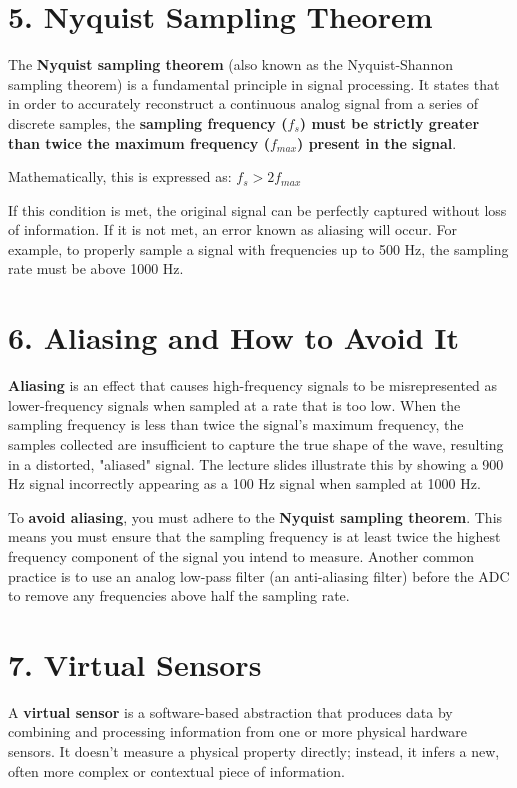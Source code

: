 \documentclass[a4paper,12pt]{article}
\begin{document}
\section*{5. Nyquist Sampling Theorem}

The \textbf{Nyquist sampling theorem} (also known as the Nyquist-Shannon sampling theorem) is a fundamental principle in signal processing. It states that in order to accurately reconstruct a continuous analog signal from a series of discrete samples, the \textbf{sampling frequency ($f_s$) must be strictly greater than twice the maximum frequency ($f_{max}$) present in the signal}. 

Mathematically, this is expressed as: $f_s > 2f_{max}$

If this condition is met, the original signal can be perfectly captured without loss of information. If it is not met, an error known as aliasing will occur. For example, to properly sample a signal with frequencies up to 500 Hz, the sampling rate must be above 1000 Hz. 

\section*{6. Aliasing and How to Avoid It}

\textbf{Aliasing} is an effect that causes high-frequency signals to be misrepresented as lower-frequency signals when sampled at a rate that is too low. When the sampling frequency is less than twice the signal's maximum frequency, the samples collected are insufficient to capture the true shape of the wave, resulting in a distorted, "aliased" signal. The lecture slides illustrate this by showing a 900 Hz signal incorrectly appearing as a 100 Hz signal when sampled at 1000 Hz. 

To \textbf{avoid aliasing}, you must adhere to the \textbf{Nyquist sampling theorem}. This means you must ensure that the sampling frequency is at least twice the highest frequency component of the signal you intend to measure. Another common practice is to use an analog low-pass filter (an anti-aliasing filter) before the ADC to remove any frequencies above half the sampling rate. 

\section*{7. Virtual Sensors}

A \textbf{virtual sensor} is a software-based abstraction that produces data by combining and processing information from one or more physical hardware sensors. It doesn't measure a physical property directly; instead, it infers a new, often more complex or contextual piece of information. 
\end{document}
